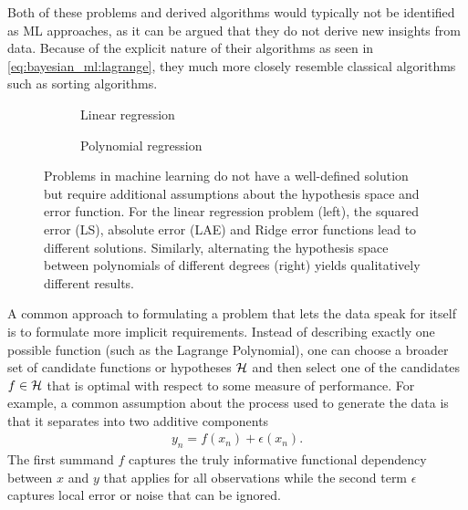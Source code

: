 Both of these problems and derived algorithms would typically not be identified as ML approaches, as it can be argued that they do not derive new insights from data.
Because of the explicit nature of their algorithms as seen in \cref{eq:bayesian_ml:lagrange}, they much more closely resemble classical algorithms such as sorting algorithms.

\begin{figure}[t]
    \begin{subfigure}[b]{\halffigurewidth}
        \centering
        \caption{
            Linear regression
            \label{fig:bayesian_ml:polynomials:linear}
        }
    \end{subfigure}
    \hfill
    \begin{subfigure}[b]{\halffigurewidth}
        \centering
        \caption{
            Polynomial regression
            \label{fig:bayesian_ml:polynomials:polynomial}
        }
    \end{subfigure}
    \caption[Polynomial regression]{
        \label{fig:bayesian_ml:polynomials:ml}
        Problems in machine learning do not have a well-defined solution but require additional assumptions about the hypothesis space and error function.
        For the linear regression problem (left), the squared error (LS), absolute error (LAE) and Ridge error functions lead to different solutions.
        Similarly, alternating the hypothesis space between polynomials of different degrees (right) yields qualitatively different results.
    }
\end{figure}
A common approach to formulating a problem that lets the data speak for itself is to formulate more implicit requirements.
Instead of describing exactly one possible function (such as the Lagrange Polynomial), one can choose a broader set of candidate functions or hypotheses $\mathcal{H}$ and then select one of the candidates $f \in \mathcal{H}$ that is optimal with respect to some measure of performance.
For example, a common assumption about the process used to generate the data is that it separates into two additive components
\begin{align}
    \label{eq:bayesian_ml:additive_noise}
    y_n = f(x_n) + \epsilon(x_n).
\end{align}
The first summand $f$ captures the truly informative functional dependency between $x$ and $y$ that applies for all observations while the second term $\epsilon$ captures local error or noise that can be ignored.

